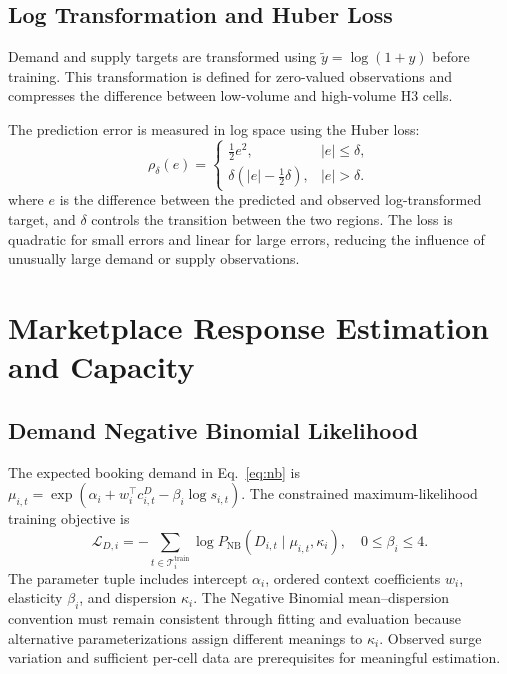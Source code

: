\documentclass[a4paper,10pt,twocolumn]{article}
\begin{document}
\subsection{Log Transformation and Huber Loss}
Demand and supply targets are transformed using
$\widetilde y=\log(1+y)$ before training. This transformation is defined
for zero-valued observations and compresses the difference between
low-volume and high-volume H3 cells.

The prediction error is measured in log space using the Huber loss:
\begin{equation}
\rho_\delta(e)=
\begin{cases}
 \frac12e^2, & |e|\le\delta,\\
 \delta\left(|e|-\frac12\delta\right), & |e|>\delta.
\end{cases}
\label{eq:huber}
\end{equation}
where $e$ is the difference between the predicted and observed log-transformed
target, and $\delta$ controls the transition between the two regions. The loss
is quadratic for small errors and linear for large errors, reducing the
influence of unusually large demand or supply observations.

\section{Marketplace Response Estimation and Capacity}\label{app:response}
\subsection{Demand Negative Binomial Likelihood}
The expected booking demand in Eq.~\eqref{eq:nb} is
$\mu_{i,t}=\exp(\alpha_i+w_i^\top c^D_{i,t}-\beta_i\log s_{i,t})$.
The constrained maximum-likelihood training objective is
\begin{equation}
 \mathcal L_{D,i}=
 -\sum_{t\in\mathcal T_i^{\mathrm{train}}}
 \log P_{\mathrm{NB}}(D_{i,t}\mid\mu_{i,t},\kappa_i),
 \quad0\le\beta_i\le4.
 \label{eq:nbnll}
\end{equation}
The parameter tuple includes intercept $\alpha_i$, ordered context
coefficients $w_i$, elasticity $\beta_i$, and dispersion $\kappa_i$.
The Negative Binomial mean--dispersion convention must remain consistent
through fitting and evaluation because alternative parameterizations assign
different meanings to $\kappa_i$. Observed surge variation and sufficient
per-cell data are prerequisites for meaningful estimation.
\end{document}
